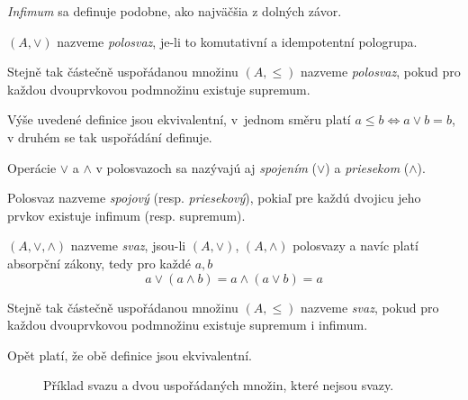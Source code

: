 {\em Infimum} sa definuje podobne, ako najväčšia z dolných závor.

\begin{definition}[Polosvaz]
    $(A, \vee)$ nazveme {\em polosvaz}, je-li to komutativní a
    idempotentní pologrupa.

    Stejně tak částečně uspořádanou množinu $(A, \leq)$ nazveme
    {\em polosvaz}, pokud pro každou dvouprvkovou podmnožinu existuje supremum.
\end{definition}

Výše uvedené definice jsou ekvivalentní, v~jednom směru platí
$a \leq b \iff a \vee b = b$, v druhém se tak uspořádání definuje.

Operácie $\vee$ a $\wedge$ v polosvazoch sa nazývajú aj 
{\em spojením} ($\vee$) a {\em priesekom} ($\wedge$).

\begin{definition}
    Polosvaz nazveme {\em spojový} (resp. {\em priesekový}), 
	pokiaľ pre každú dvojicu jeho prvkov existuje infimum (resp. supremum).
\end{definition}

\begin{definition}[Svaz]
    $(A, \vee, \wedge)$ nazveme {\em svaz}, jsou-li
    $(A, \vee)$, $(A, \wedge)$ polosvazy a navíc platí absorpční zákony,
    tedy pro každé $a, b$
    \[ a \vee (a \wedge b) = a \wedge (a \vee b) = a \]

    Stejně tak částečně uspořádanou množinu $(A, \leq)$ nazveme
    {\em svaz}, pokud pro každou dvouprvkovou podmnožinu existuje
    supremum i infimum.
\end{definition}

Opět platí, že obě definice jsou ekvivalentní.

\begin{figure}[h!]
\centering
{}
\hspace{10pt}
\hspace{10pt}
\caption{
Příklad svazu a dvou uspořádaných množin, které nejsou svazy.}
\end{figure}

